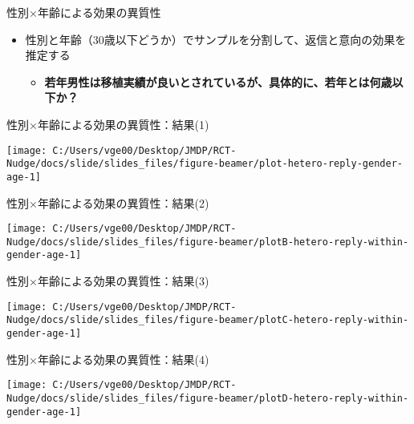 \documentclass[
      aspectratio=169,
        12pt,
    ]{beamer}
\renewcommand{\textbf}[1]{{\color{DarkBlue}\bfseries#1}}
\providecommand{\tightlist}{%
  \setlength{\itemsep}{0pt}\setlength{\parskip}{0pt}}
\begin{document}
\begin{frame}{性別×年齢による効果の異質性}
\protect\hypertarget{ux6027ux5225ux5e74ux9f62ux306bux3088ux308bux52b9ux679cux306eux7570ux8ceaux6027}{}
\begin{itemize}
\tightlist
\item
  性別と年齢（30歳以下どうか）でサンプルを分割して、返信と意向の効果を推定する

  \begin{itemize}
  \tightlist
  \item
    \textbf{若年男性は移植実績が良いとされているが、具体的に、若年とは何歳以下か？}
  \end{itemize}
\end{itemize}
\end{frame}

\begin{frame}{性別×年齢による効果の異質性：結果(1)}
\protect\hypertarget{ux6027ux5225ux5e74ux9f62ux306bux3088ux308bux52b9ux679cux306eux7570ux8ceaux6027ux7d50ux679c1}{}
\begin{center}\texttt{[image: C:/Users/vge00/Desktop/JMDP/RCT-Nudge/docs/slide/slides\_files/figure-beamer/plot-hetero-reply-gender-age-1]} \end{center}
\end{frame}

\begin{frame}{性別×年齢による効果の異質性：結果(2)}
\protect\hypertarget{ux6027ux5225ux5e74ux9f62ux306bux3088ux308bux52b9ux679cux306eux7570ux8ceaux6027ux7d50ux679c2}{}
\begin{center}\texttt{[image: C:/Users/vge00/Desktop/JMDP/RCT-Nudge/docs/slide/slides\_files/figure-beamer/plotB-hetero-reply-within-gender-age-1]} \end{center}
\end{frame}

\begin{frame}{性別×年齢による効果の異質性：結果(3)}
\protect\hypertarget{ux6027ux5225ux5e74ux9f62ux306bux3088ux308bux52b9ux679cux306eux7570ux8ceaux6027ux7d50ux679c3}{}
\begin{center}\texttt{[image: C:/Users/vge00/Desktop/JMDP/RCT-Nudge/docs/slide/slides\_files/figure-beamer/plotC-hetero-reply-within-gender-age-1]} \end{center}
\end{frame}

\begin{frame}{性別×年齢による効果の異質性：結果(4)}
\protect\hypertarget{ux6027ux5225ux5e74ux9f62ux306bux3088ux308bux52b9ux679cux306eux7570ux8ceaux6027ux7d50ux679c4}{}
\begin{center}\texttt{[image: C:/Users/vge00/Desktop/JMDP/RCT-Nudge/docs/slide/slides\_files/figure-beamer/plotD-hetero-reply-within-gender-age-1]} \end{center}
\end{frame}
\end{document}
